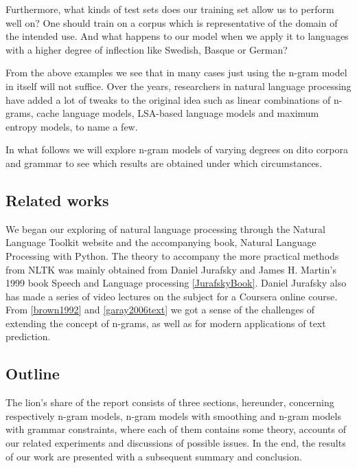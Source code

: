 \documentclass[a4paper,12pt]{article}
\begin{document}
Furthermore, what kinds of test sets does our training set allow us to perform well on? One should train on a  corpus which is representative of the domain of the intended use. And what happens to our model when we apply it to languages with a higher degree of inflection like Swedish, Basque or German?

From the above examples we see that in many cases just using the n-gram model in itself will not suffice. Over the years, researchers in natural language processing have added a lot of tweaks to the original idea such as linear combinations of n-grams, cache language models, LSA-based language models and maximum entropy models, to name a few.

In what follows we will explore n-gram models of varying degrees on dito corpora and grammar to see which results are obtained under which circumstances.

\subsection{Related works}
We began our exploring of natural language processing through the Natural Language Toolkit website and the accompanying book, Natural Language Processing with Python. The theory to accompany the more practical methods from NLTK was mainly obtained from Daniel Jurafsky and James H. Martin's 1999 book Speech and Language processing \ref{JurafskyBook}. Daniel Jurafsky also has made a series of video lectures on the subject for a Coursera online course. From \ref{brown1992} and \ref{garay2006text} we got a sense of the challenges of extending the concept of n-grams, as well as for modern applications of text prediction.

\subsection{Outline}
The lion's share of the report consists of three sections, hereunder, concerning respectively n-gram models, n-gram models with smoothing and n-gram models with grammar constraints, where each of them contains some theory, accounts of our related experiments and discussions of possible issues. In the end, the results of our work are presented with a subsequent summary and conclusion.

\end{document}
